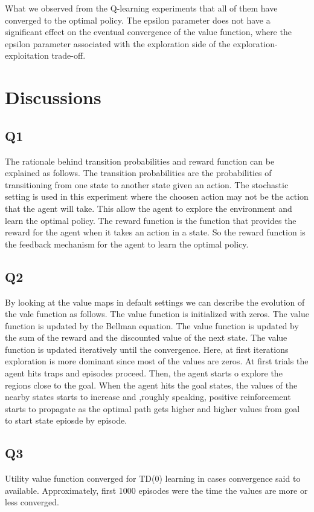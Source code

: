 \documentclass{assignment}
\begin{document}
What we observed from the Q-learning experiments that all of them have converged to the optimal policy. The epsilon parameter does not have a significant effect on the eventual convergence of the value function, where the epsilon parameter associated with the exploration side of the exploration-exploitation trade-off. 





\section{Discussions}
\subsection{Q1}
The rationale behind transition probabilities and reward function can be explained as follows. The transition probabilities are the probabilities of transitioning from one state to another state given an action. The stochastic setting is used in this experiment where the choosen action may not be the action that the agent will take. This allow the agent to explore the environment and learn the optimal policy. The reward function is the function that provides the reward for the agent when it takes an action in a state. So the reward function is the feedback mechanism for the agent to learn the optimal policy.
\subsection{Q2}
By looking at the value maps in default settings we can describe the evolution of the vale function as follows. The value function is initialized with zeros. The value function is updated by the Bellman equation. The value function is updated by the sum of the reward and the discounted value of the next state. The value function is updated iteratively until the convergence. Here, at first iterations exploration is more dominant since most of the values are zeros. At first trials the agent hits traps and episodes proceed. Then, the agent starts o explore the regions close to the goal. When the agent hits the goal states, the values of the nearby states starts to increase and ,roughly speaking, positive reinforcement starts to propagate as the optimal path gets higher and higher values from goal to start state epiosde by episode. 
\subsection{Q3}
Utility value function converged for TD(0) learning in cases convergence said to available. Approximately, first 1000 episodes were the time the values are more or less converged.
\end{document}
